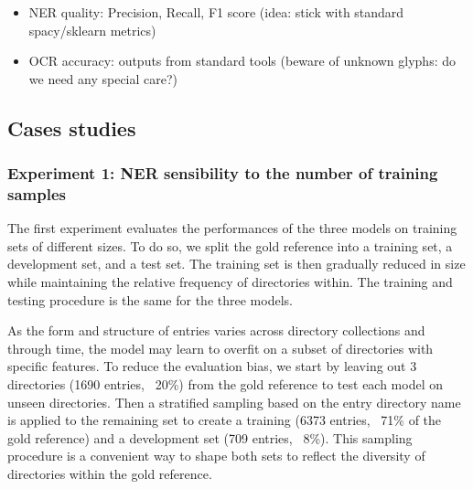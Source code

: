\begin{itemize}
    \item NER quality: Precision, Recall, F1 score (idea: stick with standard spacy/sklearn metrics) 
    \item OCR accuracy: outputs from standard tools (beware of unknown glyphs: do we need any special care?) 
    
\end{itemize}

\subsection{Cases studies}
\subsubsection{Experiment 1: NER sensibility to the number of training samples}
The first experiment evaluates the performances of the three models on training sets of different sizes.
To do so, we split the gold reference into a training set, a development set, and a test set. The training set is then gradually reduced in size while maintaining the relative frequency of directories within.
The training and testing procedure is the same for the three models.

As the form and structure of entries varies across directory collections and through time, the model may learn to overfit on a subset of directories with specific features.
To reduce the evaluation bias, we start by leaving out 3 directories (1690 entries, ~20\%) from the gold reference to test each model on unseen directories.
Then a stratified sampling based on the entry directory name is applied to the remaining set to create a training (6373 entries, ~71\% of the gold reference) and a development set (709 entries, ~8\%).
This sampling procedure is a convenient way to shape both sets to reflect the diversity of directories within the gold reference.

